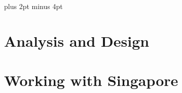 \documentclass[a4paper,titlepage]{article}
\begin{document}
\parindent=0pt %
\parskip=8pt plus 2pt minus 4pt


\setcounter{page}{1}

\tableofcontents
\newpage

\begin{spacing}{1.15}

\pagebreak

\section{Analysis and Design}







\pagebreak

\pagebreak
\section{Working with Singapore}

\pagebreak

\pagebreak

\pagebreak

\end{spacing}
\pagebreak


\newpage
{}
\appendix
{}

\end{document}
